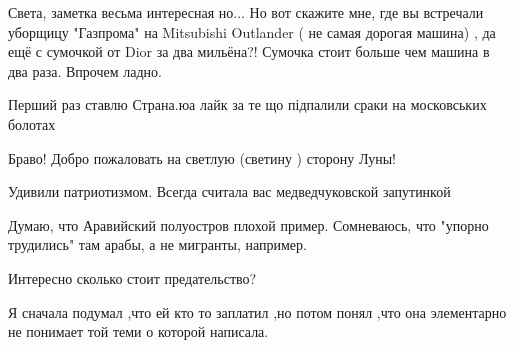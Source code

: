 \begin{itemize}
Света, заметка весьма интересная но... Но вот скажите мне, где вы встречали уборщицу "Газпрома" на Mitsubishi Outlander ( не самая дорогая машина) , да ещё с сумочкой от Dior за два мильёна?! Сумочка стоит больше чем машина в два раза. Впрочем ладно.

 
Перший раз ставлю Страна.юа лайк за те що підпалили сраки на московських болотах

 
Браво! Добро пожаловать на светлую (светину \Smiley[1.0][yellow] ) сторону Луны! \Smiley[1.0][yellow]

 
Удивили патриотизмом. Всегда считала вас медведчуковской запутинкой

 
Думаю, что Аравийский полуостров плохой пример. Сомневаюсь, что "упорно трудились" там арабы, а не мигранты, например.

 
Интересно сколько стоит предательство?

 
Я сначала подумал ,что ей кто то заплатил ,но потом понял ,что она элементарно не понимает той теми о которой написала.


\end{itemize}
